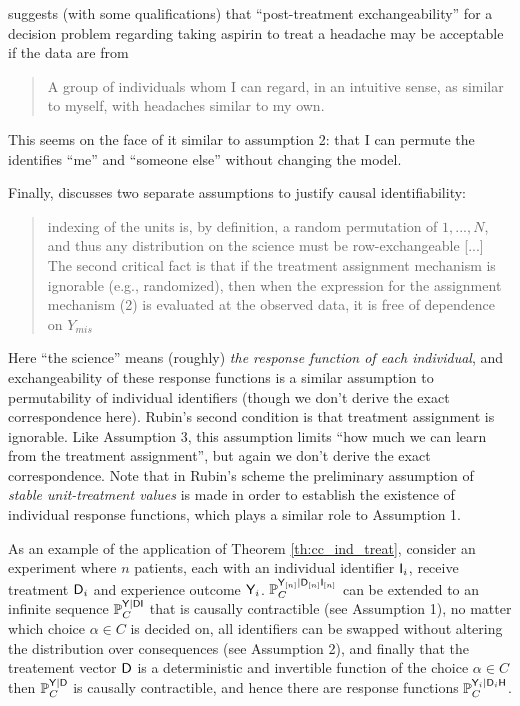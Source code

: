 \citet{dawid_decision-theoretic_2020} suggests (with some qualifications) that ``post-treatment exchangeability'' for a decision problem regarding taking aspirin to treat a headache may be acceptable if the data are from
\begin{quote}
    A group of individuals whom I can regard, in an intuitive sense, as similar to myself, with headaches similar to my own.
\end{quote}
This seems on the face of it similar to assumption 2: that I can permute the identifies ``me'' and ``someone else'' without changing the model.

Finally, \citet{rubin_causal_2005} discusses two separate assumptions to justify causal identifiability:
\begin{quote}
    indexing of the units is, by definition, a random permutation of $1,..., N$, and thus any distribution on the science must be row-exchangeable [...] The second critical fact is that if the treatment assignment mechanism is ignorable (e.g., randomized), then when the expression for the assignment mechanism (2) is evaluated at the observed data, it is free of dependence on $Y_{mis}$
\end{quote}
Here ``the science'' means (roughly) \emph{the response function of each individual}, and exchangeability of these response functions is a similar assumption to permutability of individual identifiers (though we don't derive the exact correspondence here). Rubin's second condition is that treatment assignment is ignorable. Like Assumption 3, this assumption limits ``how much we can learn from the treatment assignment'', but again we don't derive the exact correspondence. Note that in Rubin's scheme the preliminary assumption of \emph{stable unit-treatment values} is made in order to establish the existence of individual response functions, which plays a similar role to Assumption 1.

As an example of the application of Theorem \ref{th:cc_ind_treat}, consider an experiment where $n$ patients, each with an individual identifier $\mathsf{I}_i$, receive treatment $\mathsf{D}_i$ and experience outcome $\mathsf{Y}_i$. $\mathbb{P}_C^{\mathsf{Y}_{[n]}|\mathsf{D}_{[n]}\mathsf{I}_{[n]}}$ can be extended to an infinite sequence $\mathbb{P}_C^{\mathsf{Y}|\mathsf{DI}}$ that is causally contractible (see Assumption 1), no matter which choice $\alpha\in C$ is decided on, all identifiers can be swapped without altering the distribution over consequences (see Assumption 2), and finally that the treatement vector $\mathsf{D}$ is a deterministic and invertible function of the choice $\alpha\in C$ then $\mathbb{P}_C^{\mathsf{Y}|\mathsf{D}}$ is causally contractible, and hence there are response functions $\mathbb{P}_C^{\mathsf{Y}_i|\mathsf{D}_i\mathsf{H}}$.

